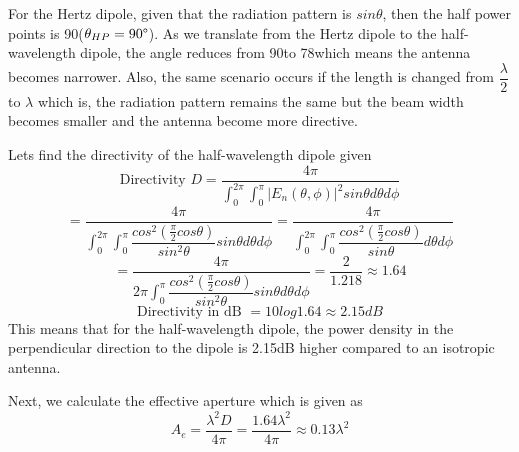 For the Hertz dipole, given that the radiation pattern is $sin\theta$, then the half power points is 90\textdegree($\theta_{HP} = 90\text{\textdegree}$). As we translate from the Hertz dipole to the half-wavelength dipole, the angle reduces from 90\textdegree to 78\textdegree  which means the antenna becomes narrower. Also, the same scenario occurs if the length is changed from $\dfrac{\lambda}{2}$ to $\lambda$ which is, the radiation pattern remains the same but the beam width becomes smaller and the antenna become more directive.

Lets find the directivity of the half-wavelength dipole given 
\[ \text{Directivity }D = \dfrac{4\pi}{\int_{0}^{2\pi}\int_{0}^{\pi}|E_n(\theta ,\phi)|^2sin\theta d\theta d\phi} \]
\[ = \dfrac{4\pi}{\int_{0}^{2\pi}\int_{0}^{\pi}\dfrac{cos^2(\frac{\pi}{2}cos\theta)}{sin^2\theta}sin\theta d\theta d\phi} = \dfrac{4\pi}{\int_{0}^{2\pi}\int_{0}^{\pi}\dfrac{cos^2(\frac{\pi}{2}cos\theta)}{sin\theta} d\theta d\phi} \]
\[ = \dfrac{4\pi}{2\pi\int_{0}^{\pi}\dfrac{cos^2(\frac{\pi}{2}cos\theta)}{sin^2\theta}sin\theta d\theta d\phi} = \dfrac{2}{1.218} \approx 1.64 \]
\[ \text{Directivity in dB } = 10log1.64 \approx 2.15dB \]
This means that for the half-wavelength dipole, the power density in the perpendicular direction to the dipole is 2.15dB higher compared to an isotropic antenna.

Next, we calculate the effective aperture which is given as 
\[A_e = \dfrac{\lambda^2 D}{4\pi} = \dfrac{1.64\lambda^2}{4\pi} \approx 0.13\lambda^2 \]

